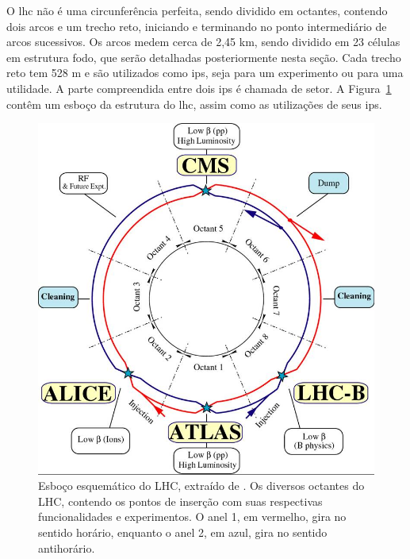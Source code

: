 

O \gls{lhc} não é uma circunferência perfeita, sendo dividido em octantes, 
contendo dois arcos e um trecho reto, iniciando e terminando no ponto
intermediário de arcos sucessivos. Os arcos medem cerca de 2,45 km,
sendo dividido em 23 células em estrutura \gls{fodo}, que serão detalhadas
posteriormente nesta seção. 
Cada trecho reto tem 528 m e são utilizados como \glspl{ip},
seja para um experimento ou para uma utilidade. A parte
compreendida entre dois \glspl{ip} é chamada de setor. A 
Figura~\ref{fig:esquema_lhc} contêm um esboço da estrutura do \gls{lhc}, assim
como as utilizações de seus \glspl{ip}.

\begin{figure}[h!t]
\centering
\includegraphics[width=.6\textwidth]{imagens/lhc-schematic.png}
\caption{Esboço esquemático do LHC, extraído de
\cite{webLHC}. Os diversos octantes do LHC, contendo os pontos de inserção 
com suas respectivas funcionalidades e experimentos.
O anel 1, em vermelho, gira no sentido horário, enquanto o anel
2, em azul, gira no sentido antihorário.}
\label{fig:esquema_lhc}
\end{figure}

